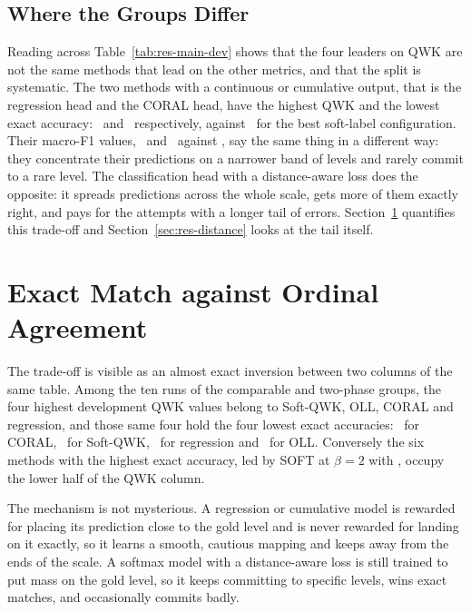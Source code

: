 \subsection{Where the Groups Differ}

Reading across Table~\ref{tab:res-main-dev} shows that the four leaders on QWK are not the same
methods that lead on the other metrics, and that the split is systematic. The two methods with
a continuous or cumulative output, that is the regression head and the CORAL head, have the
highest QWK and the lowest exact accuracy: \devAccMSE\ and \devAccCoral\ respectively, against
\devAccSoftTwo\ for the best soft-label configuration. Their macro-F1 values, \devMfMSE\ and
\devMfCoral\ against \devMfSoftTwo, say the same thing in a different way: they concentrate
their predictions on a narrower band of levels and rarely commit to a rare level. The
classification head with a distance-aware loss does the opposite: it spreads predictions across
the whole scale, gets more of them exactly right, and pays for the attempts with a longer tail
of errors. Section~\ref{sec:res-tradeoff} quantifies this trade-off and
Section~\ref{sec:res-distance} looks at the tail itself.

\section{Exact Match against Ordinal Agreement}
\label{sec:res-tradeoff}

The trade-off is visible as an almost exact inversion between two columns of the same table. Among
the ten runs of the comparable and two-phase groups, the four highest development QWK values
belong to Soft-QWK, OLL, CORAL and regression, and those same four hold the four lowest exact
accuracies: \devAccCoral\ for CORAL, \devAccSoftqwk\ for Soft-QWK, \devAccMSE\ for regression
and \devAccOLL\ for OLL. Conversely the six methods with the highest exact accuracy, led by
SOFT at $\beta=2$ with \devAccSoftTwo, occupy the lower half of the QWK column.

The mechanism is not mysterious. A regression or cumulative model is rewarded for placing its
prediction close to the gold level and is never rewarded for landing on it exactly, so it
learns a smooth, cautious mapping and keeps away from the ends of the scale. A softmax model
with a distance-aware loss is still trained to put mass on the gold level, so it keeps
committing to specific levels, wins exact matches, and occasionally commits badly.

